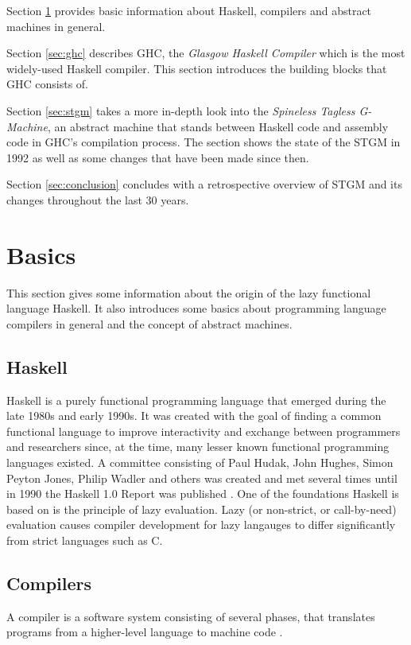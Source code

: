 \documentclass[runningheads]{llncs}
\begin{document}
Section \ref{sec:basics} provides basic information about Haskell, compilers and abstract machines in general.

Section \ref{sec:ghc} describes GHC, the \textit{Glasgow Haskell Compiler} which is the most widely-used Haskell compiler. This section introduces the building blocks that GHC consists of.

Section \ref{sec:stgm} takes a more in-depth look into the \textit{Spineless Tagless G-Machine}, an abstract machine that stands between Haskell code and assembly code in GHC's compilation process. The section shows the state of the STGM in 1992 as well as some changes that have been made since then.

Section \ref{sec:conclusion} concludes with a retrospective overview of STGM and its changes throughout the last 30 years.

\newpage
\section{Basics}
\label{sec:basics}
This section gives some information about the origin of the lazy functional language Haskell. It also introduces some basics about programming language compilers in general and the concept of abstract machines.

\subsection{Haskell}
Haskell is a purely functional programming language that emerged during the late 1980s and early 1990s. It was created with the goal of finding a common functional language to improve interactivity and exchange between programmers and researchers since, at the time, many lesser known functional programming languages existed. A committee consisting of Paul Hudak, John Hughes, Simon Peyton Jones, Philip Wadler and others was created and met several times until in 1990 the Haskell 1.0 Report was published \cite{hudak2007history}. One of the foundations Haskell is based on is the principle of lazy evaluation. Lazy (or non-strict, or call-by-need) evaluation causes compiler development for lazy langauges to differ significantly from strict languages such as C.

\subsection{Compilers}
A compiler is a software system consisting of several phases, that translates programs from a higher-level language to machine code \cite{muchnick1997advanced}.
\end{document}

